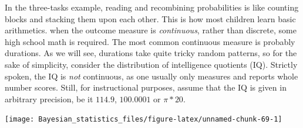 \documentclass[]{svmono}
\newenvironment{Shaded}{\begin{snugshade}}{\end{snugshade}}
\newcommand{\KeywordTok}[1]{\textcolor[rgb]{0.13,0.29,0.53}{\textbf{#1}}}
\newcommand{\DataTypeTok}[1]{\textcolor[rgb]{0.13,0.29,0.53}{#1}}
\newcommand{\DecValTok}[1]{\textcolor[rgb]{0.00,0.00,0.81}{#1}}
\newcommand{\StringTok}[1]{\textcolor[rgb]{0.31,0.60,0.02}{#1}}
\newcommand{\OperatorTok}[1]{\textcolor[rgb]{0.81,0.36,0.00}{\textbf{#1}}}
\newcommand{\NormalTok}[1]{#1}
\begin{document}
In the three-tasks example, reading and recombining probabilities is
like counting blocks and stacking them upon each other. This is how most
children learn basic arithmetics. when the outcome measure is
\emph{continuous}, rather than discrete, some high school math is
required. The most common continuous measure is probably durations. As
we will see, durations take quite tricky random patterns, so for the
sake of simplicity, consider the distribution of intelligence quotients
(IQ). Strictly spoken, the IQ is \emph{not} continuous, as one usually
only measures and reports whole number scores. Still, for instructional
purposes, assume that the IQ is given in arbitrary precision, be it
\(114.9\), \(100.0001\) or \(\pi * 20\).

\begin{Shaded}
\end{Shaded}

\texttt{[image: Bayesian\_statistics\_files/figure-latex/unnamed-chunk-69-1]}
\end{document}
